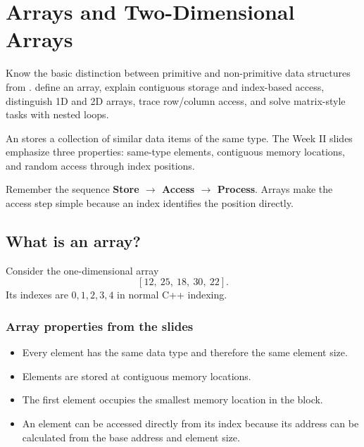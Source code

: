 \chapter{Arrays and Two-Dimensional Arrays}\label{ch:arrays}

\chapterguide%
  {Know the basic distinction between primitive and non-primitive data structures from .}
  {define an array, explain contiguous storage and index-based access, distinguish 1D and 2D arrays, trace row/column access, and solve matrix-style tasks with nested loops.}

An  stores a collection of similar data items of the same type. The Week II slides emphasize three properties: same-type elements, contiguous memory locations, and random access through index positions.

\begin{firstread}
Remember the sequence \textbf{Store $\rightarrow$ Access $\rightarrow$ Process}. Arrays make the access step simple because an index identifies the position directly.
\end{firstread}

\section{What is an array?}

Consider the one-dimensional array
\[
[12,\ 25,\ 18,\ 30,\ 22].
\]
Its indexes are $0,1,2,3,4$ in normal C++ indexing.

\begin{mlfigure}
\end{mlfigure}

\subsection{Array properties from the slides}

\begin{itemize}
  \item Every element has the same data type and therefore the same element size.
  \item Elements are stored at contiguous memory locations.
  \item The first element occupies the smallest memory location in the block.
  \item An element can be accessed directly from its index because its address can be calculated from the base address and element size.
\end{itemize}

